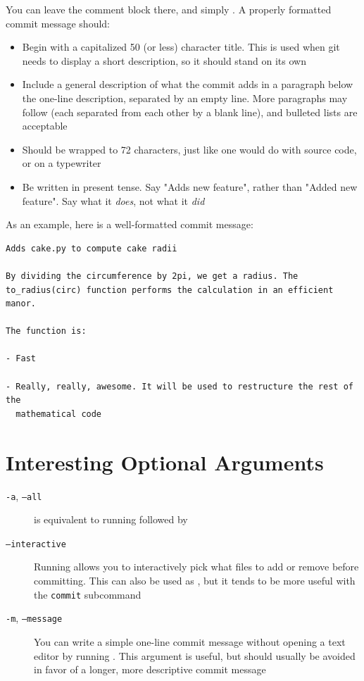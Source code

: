 \documentclass[11pt,letterpaper,twoside]{report}
\begin{document}
You can leave the comment block there, and simply . A properly formatted commit message should:

\begin{itemize}
\item Begin with a capitalized 50 (or less) character title. This is used when
    git needs to display a short description, so it should stand on its own
\item Include a general description of what the commit adds in a paragraph below
    the one-line description, separated by an empty line. More paragraphs may
    follow (each separated from each other by a blank line), and bulleted lists
    are acceptable
\item Should be wrapped to 72 characters, just like one would do with source
    code, or on a typewriter
\item Be written in present tense. Say "Adds new feature", rather than "Added
    new feature". Say what it \emph{does}, not what it \emph{did}
\end{itemize}

As an example, here is a well-formatted commit message:


\begin{lstlisting}[numbers=none]
Adds cake.py to compute cake radii

By dividing the circumference by 2pi, we get a radius. The
to_radius(circ) function performs the calculation in an efficient manor.

The function is:

- Fast

- Really, really, awesome. It will be used to restructure the rest of the
  mathematical code
\end{lstlisting}

\section{Interesting Optional Arguments}

\begin{description}
\item[\texttt{-a}, \texttt{--all}]
     is equivalent to running  followed
    by 
\item[\texttt{--interactive}]
    Running  allows you to interactively pick
    what files to add or remove before committing. This can also be used as
    , but it tends to be more useful with the
    \texttt{commit} subcommand
\item[\texttt{-m}, \texttt{--message}]
    You can write a simple one-line commit message without opening a text editor
    by running . This
    argument is useful, but should usually be avoided in favor of a longer, more
    descriptive commit message
\end{description}
\end{document}
